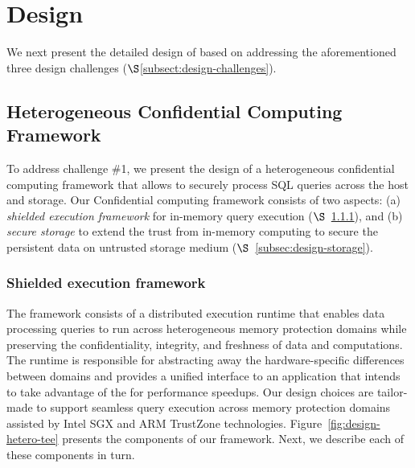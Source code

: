 \section{Design}
\label{sec:design}
We next present the detailed design of \project{} based on addressing the aforementioned three design challenges ($\S$\ref{subsect:design-challenges}).

\subsection{Heterogeneous Confidential Computing Framework}
\label{subsec:design-sef}

To address challenge \#1, we present the design of a heterogeneous confidential computing framework that allows to securely process SQL queries across the host and storage. Our Confidential computing framework consists of two aspects: (a) {\em shielded execution framework} for in-memory query execution ($\S$~\ref{subsec:shielded-exc}), and (b) {\em secure storage} to extend the trust from in-memory computing to secure the persistent data on untrusted storage medium ($\S$~\ref{subsec:design-storage}). %


\subsubsection{Shielded execution framework}
\label{subsec:shielded-exc}

The framework consists of a distributed execution runtime that enables data processing queries to run across heterogeneous memory protection domains while preserving the confidentiality, integrity, and freshness of data and computations. The runtime is responsible for abstracting away the hardware-specific differences between domains and provides a unified interface to an application that intends to take advantage of the \csd
for performance speedups. Our design choices are tailor-made to support seamless query execution across memory protection domains assisted by Intel SGX and ARM TrustZone technologies. Figure~\ref{fig:design-hetero-tee} presents the components of our framework. Next, we describe each of these components in turn. %

